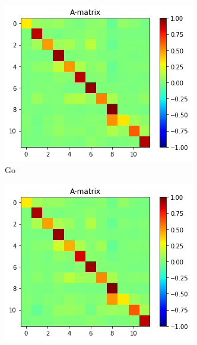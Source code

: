 \documentclass[a4paper,10pt]{article}
\begin{document}
\begin{figure}
    \centering
    \begin{subfigure}[b]{0.4\textwidth}
        \includegraphics[width=\textwidth]{img/marN_analytic_withinput_A1_Go.png}
        \caption{Go}
        \label{fig:marN_analytic_withinput_A1_Go}
    \end{subfigure}\hspace{0.05\textwidth}
    \begin{subfigure}[b]{0.4\textwidth}
        \includegraphics[width=\textwidth]{img/marN_analytic_withinput_A1_Nogo.png}

\end{subfigure}
\end{figure}
\end{document}
